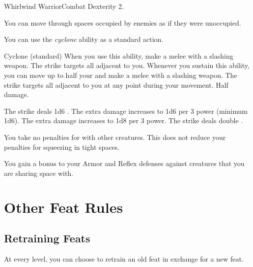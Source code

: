     \begin{feat}{Whirlwind Warrior}{Combat}
        \featpre Dexterity 2.

         You can move through spaces occupied by enemies as if they were unoccupied.

         You can use the \textit{cyclone} ability as a standard action.
        \begin{sustainability}{Cyclone}{ (standard)}
            \rankline
            When you use this ability, make a melee  with a slashing weapon.
            The strike targets all  adjacent to you.
            Whenever you sustain this ability, you can move up to half your  and make a melee  with a slashing weapon.
            The strike targets all  adjacent to you at any point during your movement.
            \miss Half damage.

            \rankline
             The strike deals 1d6 .
             The extra damage increases to 1d6 per 3 power (minimum 1d6).
             The extra damage increases to 1d8 per 3 power.
             The strike deals double .
        \end{sustainability}

         You take no penalties for \squeezing with other creatures.
        This does not reduce your penalties for squeezing in tight spaces.

         You gain a  bonus to your Armor and Reflex defenses against creatures that you are sharing space with.
    \end{feat}

\section{Other Feat Rules}

    \subsection{Retraining Feats}
        At every level, you can choose to retrain an old feat in exchange for a new feat.
